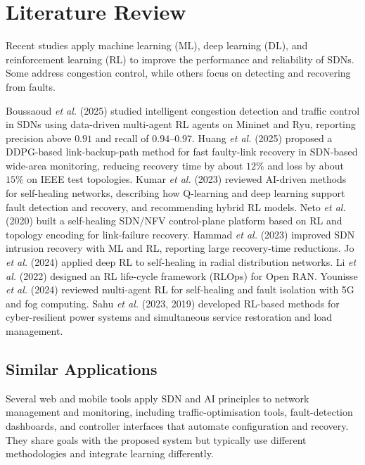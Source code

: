 \documentclass[12pt,a4paper]{report}
\begin{document}
\section{Literature Review}
Recent studies apply machine learning (ML), deep learning (DL), and reinforcement learning
(RL) to improve the performance and reliability of SDNs. Some address congestion control,
while others focus on detecting and recovering from faults.

Boussaoud \emph{et al.} (2025) studied intelligent congestion detection and traffic control
in SDNs using data-driven multi-agent RL agents on Mininet and Ryu, reporting precision
above $0.91$ and recall of $0.94$--$0.97$. Huang \emph{et al.} (2025) proposed a
DDPG-based link-backup-path method for fast faulty-link recovery in SDN-based wide-area
monitoring, reducing recovery time by about $12\%$ and loss by about $15\%$ on IEEE test
topologies. Kumar \emph{et al.} (2023) reviewed AI-driven methods for self-healing networks,
describing how Q-learning and deep learning support fault detection and recovery, and
recommending hybrid RL models. Neto \emph{et al.} (2020) built a self-healing SDN/NFV
control-plane platform based on RL and topology encoding for link-failure recovery. Hammad
\emph{et al.} (2023) improved SDN intrusion recovery with ML and RL, reporting large
recovery-time reductions. Jo \emph{et al.} (2024) applied deep RL to self-healing in radial
distribution networks. Li \emph{et al.} (2022) designed an RL life-cycle framework (RLOps)
for Open RAN. Younisse \emph{et al.} (2024) reviewed multi-agent RL for self-healing and
fault isolation with 5G and fog computing. Sahu \emph{et al.} (2023, 2019) developed
RL-based methods for cyber-resilient power systems and simultaneous service restoration and
load management.

\subsection{Similar Applications}
Several web and mobile tools apply SDN and AI principles to network management and
monitoring, including traffic-optimisation tools, fault-detection dashboards, and controller
interfaces that automate configuration and recovery. They share goals with the proposed
system but typically use different methodologies and integrate learning differently.
\end{document}
